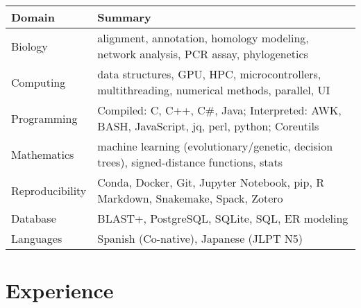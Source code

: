 \documentclass[11pt,a4paper,]{awesome-cv}
\begin{document}
\begin{tabular}{l|l}
\hline
\textbf{Domain} & \textbf{Summary}\\
\hline
Biology & alignment, annotation, homology modeling, network analysis, PCR assay, phylogenetics\\
\hline
Computing & data structures, GPU, HPC, microcontrollers, multithreading, numerical methods, parallel, UI\\
\hline
Programming & Compiled: C, C++, C\#, Java; Interpreted: AWK, BASH, JavaScript, jq, perl, python; Coreutils\\
\hline
Mathematics & machine learning (evolutionary/genetic, decision trees), signed-distance functions, stats\\
\hline
Reproducibility & Conda, Docker, Git, Jupyter Notebook, pip, R Markdown, Snakemake, Spack, Zotero\\
\hline
Database & BLAST+, PostgreSQL, SQLite, SQL, ER modeling\\
\hline
Languages & Spanish (Co-native), Japanese (JLPT N5)\\
\hline
\end{tabular}

\hypertarget{experience}{%
\section{Experience}\label{experience}}
\end{document}
